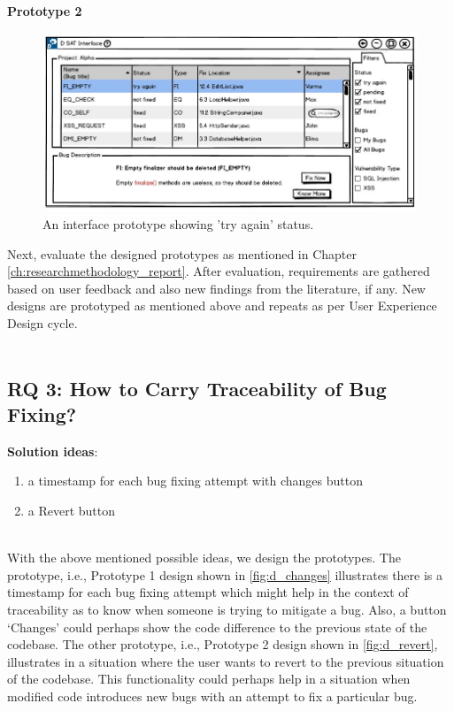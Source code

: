 \textbf{Prototype 2}
\\
\begin{figure}[hbt!]
	\centering
	\includegraphics[width=\linewidth]{figures/d_tryagain}
	\caption{An interface prototype showing 'try again' status.}
	\label{fig:d_tryagain}
\end{figure}

\clearpage

Next, evaluate the designed prototypes as mentioned in Chapter \ref{ch:researchmethodology_report}. After evaluation, requirements are gathered based on user feedback and also new findings from the literature, if any. New designs are prototyped as mentioned above and repeats as per User Experience Design cycle. \\ \\

\subsection{RQ 3: How to Carry Traceability of Bug Fixing?}
\hfill \break
\textbf{Solution ideas}: \\
\begin{enumerate}
\item  a timestamp for each bug fixing attempt with changes button
\item  a Revert button \\ \\
\end{enumerate}

With the above mentioned possible ideas, we design the prototypes. The prototype, i.e., Prototype 1 design shown in \autoref{fig:d_changes} illustrates there is a timestamp for each bug fixing attempt which might help in the context of traceability as to know when someone is trying to mitigate a bug. Also, a button ‘Changes’ could perhaps show the code difference to the previous state of the codebase. The other prototype, i.e., Prototype 2 design shown in \autoref{fig:d_revert}, illustrates in a situation where the user wants to revert to the previous situation of the codebase. This functionality could perhaps help in a situation when modified code introduces new bugs with an attempt to fix a particular bug. \\ \\

